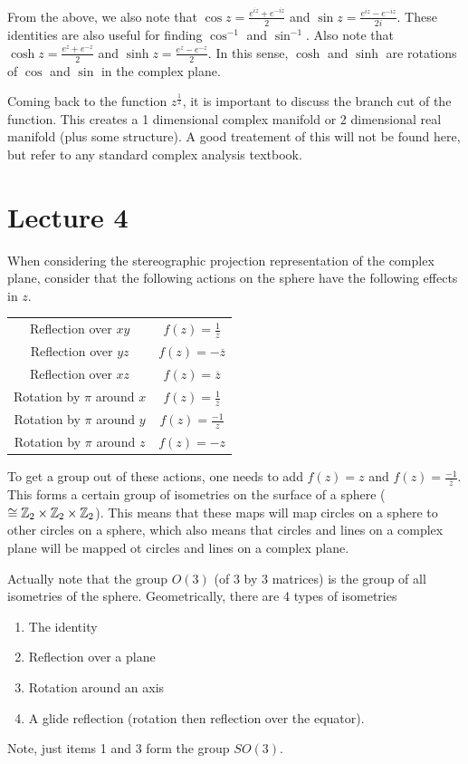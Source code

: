 \documentclass[11pt,leqno,oneside]{amsart}
\begin{document}
From the above, we also note that $\cos z = \frac{e^{iz}+e^{-iz}}{2}$ and $\sin
z = \frac{e^{iz}-e^{-iz}}{2i}$. These identities are also useful for finding
$\cos^{-1}$ and $\sin^{-1}$. Also note that $\cosh z = \frac{e^z+e^{-z}}{2}$
and $\sinh z = \frac{e^z-e^{-z}}{2}$. In this sense, $\cosh$ and $\sinh$ are
rotations of $\cos$ and $\sin$ in the complex plane.

Coming back to the function $z^{\frac{1}{2}}$, it is important to discuss the
branch cut of the function. This creates a 1 dimensional complex manifold or
2 dimensional real manifold (plus some structure). A good treatement of this
will not be found here, but refer to any standard complex analysis textbook.

\section{Lecture 4}
When considering the stereographic projection representation of the complex
plane, consider that the following actions on the sphere have the following
effects in $z$.

\begin{tabular}{|c|c|}
    \hline
    Reflection over $xy$ & $f(z) = \frac{1}{\overline{z}}$ \\
    Reflection over $yz$ & $f(z) = -\overline{z}$ \\
    Reflection over $xz$ & $f(z) = \overline{z}$ \\
    Rotation by $\pi$ around $x$ & $f(z) = \frac{1}{z}$ \\
    Rotation by $\pi$ around $y$ & $f(z) = \frac{-1}{z}$ \\
    Rotation by $\pi$ around $z$ & $f(z) = -z$ \\
    \hline
\end{tabular}

To get a group out of these actions, one needs to add $f(z) = z$ and $f(z) =
\frac{-1}{\overline{z}}$. This forms a certain group of isometries on the
surface of a sphere ($\cong {\mathbb Z}_2 \times {\mathbb Z}_2 \times {\mathbb Z}_2$). This means that
these maps will map circles on a sphere to other circles on a sphere, which
also means that circles and lines on a complex plane will be mapped ot circles
and lines on a complex plane.

Actually note that the group $O(3)$ (of 3 by 3 matrices) is the group of all
isometries of the sphere. Geometrically, there are 4 types of isometries
\begin{enumerate}
    \item The identity
    \item Reflection over a plane
    \item Rotation around an axis
    \item A glide reflection (rotation then reflection over the equator).
\end{enumerate}
Note, just items 1 and 3 form the group $SO(3)$.
\end{document}
